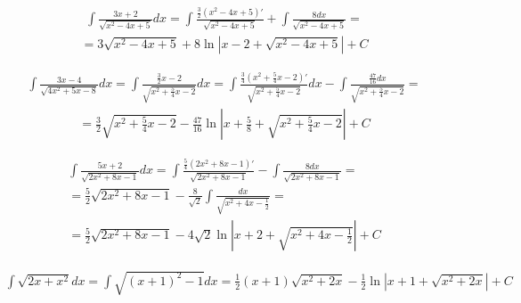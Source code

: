 
\begin{gather*}\int \frac{3x+2}{\sqrt{x^2-4x+5}}dx = \int \frac{\frac{3}{2}(x^2-4x+5)'}{\sqrt{x^2-4x+5}}+\int \frac{8dx}{\sqrt{x^2-4x+5}} = \end{gather*}
\begin{gather*}= 3\sqrt{x^2-4x+5}+8\ln|x-2+\sqrt{x^2-4x+5}|+C\end{gather*}


\begin{gather*}\int \frac{3x-4}{\sqrt{4x^2+5x-8}}dx = \int \frac{\frac{3}{2}x-2}{\sqrt{x^2+\frac{5}{4}x-2}}dx = \int \frac{\frac{3}{4}(x^2+\frac{5}{4}x-2)'}{\sqrt{x^2+\frac{5}{4}x-2}}dx-\int \frac{\frac{47}{16}dx}{\sqrt{x^2+\frac{5}{4}x-2}} = \end{gather*}
\begin{gather*}= \frac{3}{2}\sqrt{x^2+\frac{5}{4}x-2}-\frac{47}{16}\ln|x+\frac{5}{8}+\sqrt{x^2+\frac{5}{4}x-2}|+C\end{gather*}



\begin{gather*}
  \int \frac{5x+2}{\sqrt{2x^2+8x-1}}dx
  = \int \frac{\frac{5}{4}(2x^2+8x-1)'}{\sqrt{2x^2+8x-1}}-\int \frac{8dx}{\sqrt{2x^2+8x-1}} = \\
  = \frac{5}{2}\sqrt{2x^2+8x-1}-\frac{8}{\sqrt{2}}\int \frac{dx}{\sqrt{x^2+4x-\frac{1}{2}}} = \\
  = \frac{5}{2}\sqrt{2x^2+8x-1}-4\sqrt{2}\ln\left|x+2+\sqrt{x^2+4x-\frac{1}{2}}\right|+C
\end{gather*}



\begin{gather*}
  \int \sqrt{2x+x^2}dx
  = \int \sqrt{(x+1)^2-1}dx
  = \frac{1}{2}(x+1)\sqrt{x^2+2x}-\frac{1}{2}\ln|x+1+\sqrt{x^2+2x}|+C
\end{gather*}



